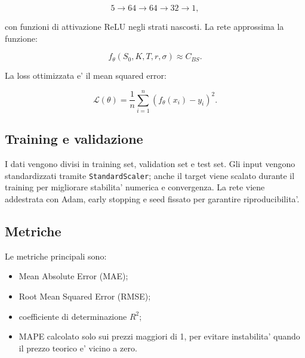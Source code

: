 \begin{equation}
    5 \rightarrow 64 \rightarrow 64 \rightarrow 32 \rightarrow 1,
\end{equation}

con funzioni di attivazione ReLU negli strati nascosti.
La rete approssima la funzione:

\begin{equation}
    f_\theta(S_0, K, T, r, \sigma) \approx C_{BS}.
\end{equation}

La loss ottimizzata e' il mean squared error:

\begin{equation}
    \mathcal{L}(\theta) =
    \frac{1}{n}
    \sum_{i=1}^{n}
    \left(f_\theta(x_i) - y_i\right)^2.
\end{equation}

\subsection{Training e validazione}

I dati vengono divisi in training set, validation set e test set.
Gli input vengono standardizzati tramite \texttt{StandardScaler}; anche il target viene scalato durante il training per migliorare stabilita' numerica e convergenza.
La rete viene addestrata con Adam, early stopping e seed fissato per garantire riproducibilita'.

\subsection{Metriche}

Le metriche principali sono:

\begin{itemize}
    \item Mean Absolute Error (MAE);
    \item Root Mean Squared Error (RMSE);
    \item coefficiente di determinazione $R^2$;
    \item MAPE calcolato solo sui prezzi maggiori di 1, per evitare instabilita' quando il prezzo teorico e' vicino a zero.
\end{itemize}
